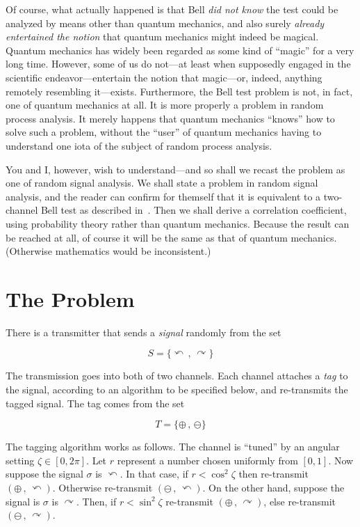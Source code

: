 \documentclass[9pt,technote]{IEEEtran}
\begin{document}
Of course, what actually happened is that Bell {\em{did not know}} the
test could be analyzed by means other than quantum mechanics, and also
surely {\em{already entertained the notion}} that quantum mechanics
might indeed be magical. Quantum mechanics has widely been regarded as
some kind of ``magic'' for a very long time. However, some of us do
not---at least when supposedly engaged in the scientific
endeavor---entertain the notion that magic---or, indeed, anything
remotely resembling it---exists. Furthermore, the Bell test problem is
not, in fact, one of quantum mechanics at all. It is more properly a
problem in random process analysis. It merely happens that quantum
mechanics ``knows'' how to solve such a problem, without the ``user''
of quantum mechanics having to understand one iota of the subject of
random process analysis.

You and I, however, wish to understand---and so shall we recast the
problem as one of random signal analysis. We shall state a problem in
random signal analysis, and the reader can confirm for themself that
it is equivalent to a two-channel Bell test as described
in~\cite{enwiki:1174875317}. Then we shall derive a correlation
coefficient, using probability theory rather than quantum
mechanics. Because the result can be reached at all, of course it will
be the same as that of quantum mechanics. (Otherwise mathematics would
be inconsistent.)

\section{The Problem}

There is a transmitter that sends a {\em{signal}} randomly from the
set

\begin{equation}
  S=\{\curvearrowleft\,,\,\curvearrowright\}
\end{equation}

The transmission goes into both of two channels. Each channel attaches
a {\em{tag}} to the signal, according to an algorithm to be specified
below, and re-transmits the tagged signal. The tag comes from the set

\begin{equation}
  T=\{\oplus\,,\,\ominus\}
\end{equation}

The tagging algorithm works as follows. The channel is ``tuned'' by an
angular setting $\zeta\in[0,2\pi]$. Let $r$ represent a number chosen
uniformly from $[0,1]$. Now suppose the signal $\sigma$ is
$\curvearrowleft$. In that case, if $r < \cos^2 \zeta$ then
re-transmit $(\oplus\,,\,\curvearrowleft)$. Otherwise re-transmit
$(\ominus\,,\,\curvearrowleft)$. On the other hand, suppose the signal
is $\sigma$ is $\curvearrowright$. Then, if $r < \sin^2 \zeta$
re-transmit $(\oplus\,,\,\curvearrowright)$, else re-transmit
$(\ominus\,,\,\curvearrowright)$.
\end{document}

